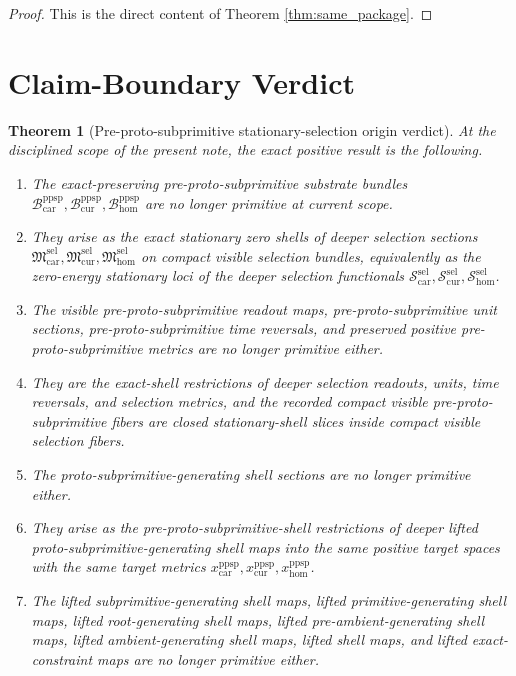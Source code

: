 \documentclass[11pt]{article}
\newcommand{\Car}{\mathrm{car}}
\newcommand{\Cur}{\mathrm{cur}}
\newcommand{\Hom}{\mathrm{hom}}
\newcommand{\PreProtoSubprimTargetMetric}[1]{x_{#1}^{\mathrm{ppsp}}}
\newcommand{\PreProtoSubprimSpace}[1]{\mathcal B_{#1}^{\mathrm{ppsp}}}
\newcommand{\SelSection}[1]{\mathfrak M_{#1}^{\mathrm{sel}}}
\newcommand{\SelFunctional}[1]{\mathscr S_{#1}^{\mathrm{sel}}}
\newtheorem{theorem}{Theorem}
\begin{document}
\begin{proof}
This is the direct content of Theorem \ref{thm:same_package}.
\end{proof}

\section{Claim-Boundary Verdict}

\begin{theorem}[Pre-proto-subprimitive stationary-selection origin verdict]
\label{thm:verdict}
At the disciplined scope of the present note, the exact positive result is the following.
\begin{enumerate}
    \item The exact-preserving pre-proto-subprimitive substrate bundles \(\PreProtoSubprimSpace{\Car},\PreProtoSubprimSpace{\Cur},\PreProtoSubprimSpace{\Hom}\) are no longer primitive at current scope.
    \item They arise as the exact stationary zero shells of deeper selection sections \(\SelSection{\Car},\SelSection{\Cur},\SelSection{\Hom}\) on compact visible selection bundles, equivalently as the zero-energy stationary loci of the deeper selection functionals \(\SelFunctional{\Car},\SelFunctional{\Cur},\SelFunctional{\Hom}\).
    \item The visible pre-proto-subprimitive readout maps, pre-proto-subprimitive unit sections, pre-proto-subprimitive time reversals, and preserved positive pre-proto-subprimitive metrics are no longer primitive either.
    \item They are the exact-shell restrictions of deeper selection readouts, units, time reversals, and selection metrics, and the recorded compact visible pre-proto-subprimitive fibers are closed stationary-shell slices inside compact visible selection fibers.
    \item The proto-subprimitive-generating shell sections are no longer primitive either.
    \item They arise as the pre-proto-subprimitive-shell restrictions of deeper lifted proto-subprimitive-generating shell maps into the same positive target spaces with the same target metrics \(\PreProtoSubprimTargetMetric{\Car},\PreProtoSubprimTargetMetric{\Cur},\PreProtoSubprimTargetMetric{\Hom}\).
    \item The lifted subprimitive-generating shell maps, lifted primitive-generating shell maps, lifted root-generating shell maps, lifted pre-ambient-generating shell maps, lifted ambient-generating shell maps, lifted shell maps, and lifted exact-constraint maps are no longer primitive either.

\end{enumerate}
\end{theorem}
\end{document}
